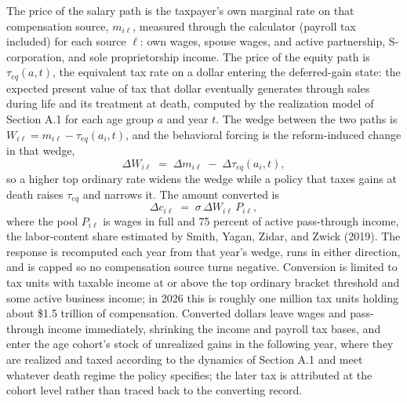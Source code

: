 \documentclass[10pt,twocolumn]{article}
\begin{document}
The price of the salary path is the taxpayer's own marginal rate on that
compensation source, $m_{i\ell}$, measured through the calculator (payroll tax
included) for each source $\ell$: own wages, spouse wages, and active
partnership, S-corporation, and sole proprietorship income. The price of the
equity path is $\tau_{eq}(a,t)$, the equivalent tax rate on a dollar entering
the deferred-gain state: the expected present value of tax that dollar
eventually generates through sales during life and its treatment at death,
computed by the realization model of Section A.1 for each age group $a$ and
year $t$. The wedge between the two paths is
$W_{i\ell} = m_{i\ell} - \tau_{eq}(a_i, t)$, and the behavioral forcing is the
reform-induced change in that wedge,
\begin{equation*}
\Delta W_{i\ell} \;=\; \Delta m_{i\ell} \;-\; \Delta\tau_{eq}(a_i, t),
\end{equation*}
so a higher top ordinary rate widens the wedge while a policy that taxes gains
at death raises $\tau_{eq}$ and narrows it. The amount converted is
\begin{equation*}
\Delta c_{i\ell} \;=\; \sigma \,\Delta W_{i\ell}\, P_{i\ell},
\end{equation*}
where the pool $P_{i\ell}$ is wages in full and 75 percent of active
pass-through income, the labor-content share estimated by Smith, Yagan, Zidar,
and Zwick (2019). The response is recomputed each year from that year's wedge,
runs in either direction, and is capped so no compensation source turns
negative. Conversion is limited to tax units with taxable income at or above
the top ordinary bracket threshold and some active business income; in 2026
this is roughly one million tax units holding about \$1.5 trillion of
compensation. Converted dollars leave wages and pass-through income
immediately, shrinking the income and payroll tax bases, and enter the age
cohort's stock of unrealized gains in the following year, where they are
realized and taxed according to the dynamics of Section A.1 and meet whatever
death regime the policy specifies; the later tax is attributed at the cohort
level rather than traced back to the converting record.
\end{document}
